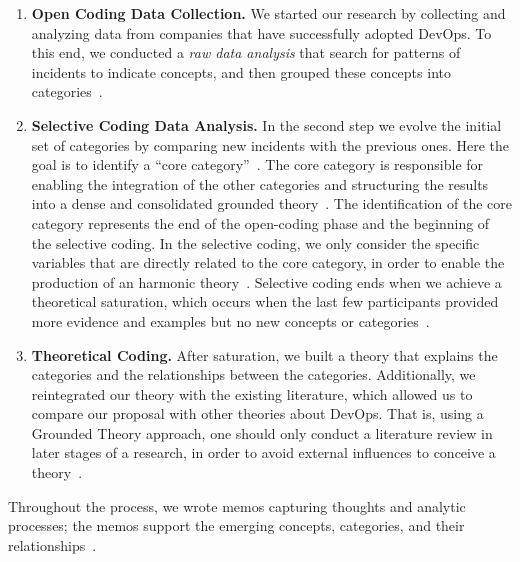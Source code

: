 \begin{enumerate}[label=(\Alph*)]
\item {\bf Open Coding Data Collection.} We started our research
  by collecting and analyzing data from companies that have successfully adopted DevOps.
  To this end, we conducted a \emph{raw data analysis} that search for patterns of
  incidents to indicate concepts,  and then grouped these concepts into
  categories~\cite{stol2016grounded}.

\item {\bf Selective Coding Data Analysis.} In the second step we evolve
  the initial set of
  categories by comparing new incidents with the previous ones. Here the goal is
  to identify a ``core category''~\cite{stol2016grounded}.
  The core category is responsible for enabling the integration of the other
  categories and structuring the results into a dense and consolidated grounded
  theory~\cite{jantunen2014using}. The identification of the core category
  represents the end of the open-coding phase and the beginning of the selective coding.
  In the selective coding, we only consider the specific variables that are directly
  related to the core category, in order to enable the production of an harmonic
  theory~\cite{coleman2007using,hoda2011impact}. Selective coding ends when we
  achieve a theoretical saturation, which occurs when the last few
  participants provided more evidence and examples but no new concepts or
  categories~\cite{glase1967discovery}.

\item {\bf Theoretical Coding.} After saturation, we built a theory that
explains the categories and the relationships between the categories.
Additionally, we reintegrated our theory with the existing literature, which allowed us to compare our proposal
 with other theories about DevOps. That is, using a Grounded Theory approach,
 one should only conduct a literature review in later stages of a research,
in order to avoid external influences to conceive a theory~\cite{adolph2012reconciling}.

\end{enumerate}

Throughout the process, we wrote memos capturing thoughts and analytic
processes; the memos support the emerging concepts, categories, and their
relationships~\cite{adolph2012reconciling}.


